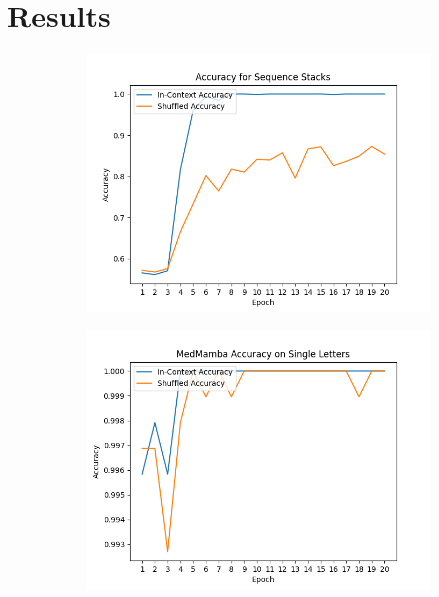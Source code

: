 \section{Results}
\begin{figure}[!ht]
    \begin{subfigure}{0.5\textwidth}
        \includegraphics[width=\textwidth]{figures/sequence_stack_mnist_like.png}
    \end{subfigure}\begin{subfigure}{0.5\textwidth}
        \includegraphics[width=\textwidth]{figures/medmamba_mnist_like.png}
    \end{subfigure}
    \begin{subfigure}{0.5\textwidth}

\end{subfigure}
\end{figure}
